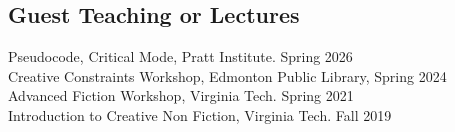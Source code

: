 \subsection{Guest Teaching or Lectures}

Pseudocode, Critical Mode, Pratt Institute. \hfill Spring 2026 \\
Creative Constraints Workshop, Edmonton Public Library, \hfill Spring 2024 \\
Advanced Fiction Workshop, Virginia Tech. \hfill Spring 2021 \\
Introduction to Creative Non Fiction, Virginia Tech. \hfill Fall 2019 \\